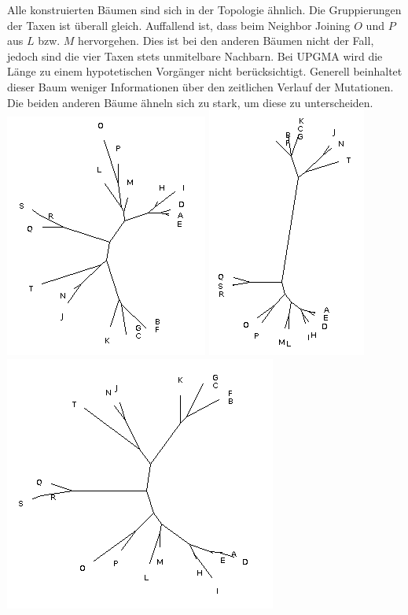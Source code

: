 \documentclass{homework}
\begin{document}
\begin{enumerate}
Alle konstruierten Bäumen sind sich in der Topologie ähnlich. Die Gruppierungen der Taxen ist überall gleich. Auffallend ist, dass beim Neighbor Joining $O$ und $P$ aus $L$ bzw. $M$ hervorgehen. Dies ist bei den anderen Bäumen nicht der Fall, jedoch sind die vier Taxen stets unmitelbare Nachbarn. Bei UPGMA wird die Länge zu einem hypotetischen Vorgänger nicht berücksichtigt. Generell beinhaltet dieser Baum weniger Informationen über den zeitlichen Verlauf der Mutationen. Die beiden anderen Bäume ähneln sich zu stark, um diese zu unterscheiden.
	\includegraphics[scale=0.4]{u3_aufg2_neighbor_joining.png} 
	\includegraphics[scale=0.4]{u3_aufg2_upgma.png} 
	\includegraphics[scale=0.4]{u3_aufg2_max_parsimony.png} 


\end{enumerate}
\end{document}
